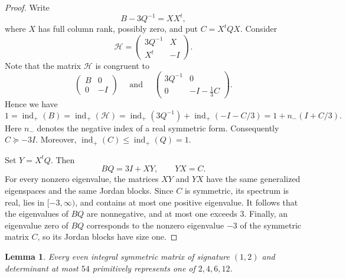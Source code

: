 \documentclass[12pt]{amsart}
\numberwithin{equation}{section}
\newtheorem{lemma}[theorem]{Lemma}
\theoremstyle{definition}
\theoremstyle{remark}
\newcommand{\indp}{\operatorname{ind}_{+}}
\begin{document}
\begin{proof}
Write
\[
                         B-3Q^{-1}=XX^t,
\]
where $X$ has full column rank, possibly zero, and put
$C=X^tQX$.  Consider
\[
 \mathcal H=
 \begin{pmatrix}
   3Q^{-1}&X\\
   X^t&-I
 \end{pmatrix}.
\]
Note that the matrix \(\mathcal H\) is congruent to
\[
\begin{pmatrix}
B & 0\\
0 & -I
\end{pmatrix}
\quad \text{ and } \quad
\begin{pmatrix}
3Q^{-1} & 0\\
0 & -I-\frac{1}{3}C
\end{pmatrix}.
\]
Hence we have 
$$  1 = \indp(B) = \indp(\mathcal H)
   =\indp(3Q^{-1})+\indp(-I-C/3)
   =1+n_-(I+C/3).$$
Here $n_-$ denotes the negative index of a real symmetric form.
Consequently $C\succeq-3I$.  Moreover,
$\indp(C)\leq \indp(Q)=1$.

Set $Y=X^tQ$.  Then
\[
                         BQ=3I+XY,
                  \qquad YX=C.
\]
For every nonzero eigenvalue, the matrices $XY$ and $YX$ have the
same generalized eigenspaces and the same Jordan blocks.
Since $C$ is symmetric, its spectrum is real, lies in $[-3,\infty)$,
and contains at most one positive eigenvalue.  It follows that the
eigenvalues of $BQ$ are nonnegative, and at most one exceeds $3$.
Finally, an eigenvalue zero of $BQ$ corresponds to the nonzero
eigenvalue $-3$ of the symmetric matrix $C$, so its Jordan blocks have
size one.
\end{proof}


\begin{lemma}\label{lem:ternary}
Every even integral symmetric matrix of signature $(1,2)$ and determinant at
most $54$ primitively represents one of $2,4,6,12$.
\end{lemma}
\end{document}
